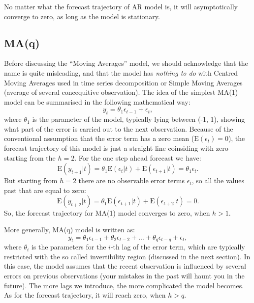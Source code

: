 \documentclass[
]{book}
\theoremstyle{definition}
\theoremstyle{definition}
\theoremstyle{definition}
\theoremstyle{definition}
\theoremstyle{remark}
\begin{document}
No matter what the forecast trajectory of AR model is, it will asymptotically converge to zero, as long as the model is stationary.

\hypertarget{MA}{%
\subsection{MA(q)}\label{MA}}

Before discussing the ``Moving Averages'' model, we should acknowledge that the name is quite misleading, and that the model has \emph{nothing to do} with Centred Moving Averages used in time series decomposition or Simple Moving Averages (average of several concequitive observation). The idea of the simplest MA(1) model can be summarised in the following mathematical way:
\begin{equation}
  {y}_{t} = \theta_1 \epsilon_{t-1} + \epsilon_t ,
  \label{eq:ARIMA001Example}
\end{equation}
where \(\theta_1\) is the parameter of the model, typically lying between (-1, 1), showing what part of the error is carried out to the next observation. Because of the conventional assumption that the error term has a zero mean (\(\mathrm{E}(\epsilon_{t})=0\)), the forecast trajectory of this model is just a straight line coinsiding with zero starting from the \(h=2\). For the one step ahead forecast we have:
\begin{equation}
  \mathrm{E}({y}_{t+1}|t) = \theta_1 \mathrm{E}(\epsilon_{t}|t) + \mathrm{E}(\epsilon_{t+1}|t) = \theta_1 \epsilon_{t}.
  \label{eq:ARIMA001ExampleForecast}
\end{equation}
But starting from \(h=2\) there are no observable error terms \(\epsilon_t\), so all the values past that are equal to zero:
\begin{equation}
  \mathrm{E}({y}_{t+2}|t) = \theta_1 \mathrm{E}(\epsilon_{t+1}|t) + \mathrm{E}(\epsilon_{t+2}|t) = 0.
  \label{eq:ARIMA001ExampleForecastInSample}
\end{equation}
So, the forecast trajectory for MA(1) model converges to zero, when \(h>1\).

More generally, MA(q) model is written as:
\begin{equation}
  {y}_{t} = \theta_1 \epsilon_{t-1} + \theta_2 \epsilon_{t-2} + \dots + \theta_q \epsilon_{t-q} + \epsilon_t ,
  \label{eq:ARIMA00qExample}
\end{equation}
where \(\theta_i\) is the parameters for the \(i\)-th lag of the error term, which are typically restricted with the so called invertibility region (discussed in the next section). In this case, the model assumes that the recent observation is influenced by several errors on previous observations (your mistakes in the past will haunt you in the future). The more lags we introduce, the more complicated the model becomes. As for the forecast trajectory, it will reach zero, when \(h>q\).
\end{document}
